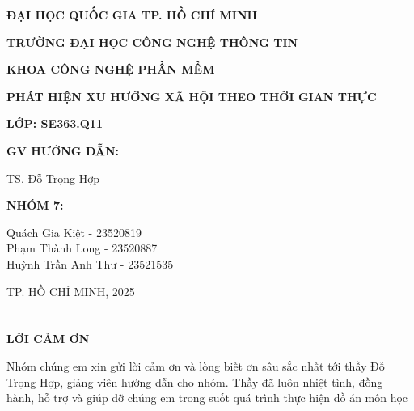 \documentclass[a4paper]{report}
\begin{document}
\fontsize{13pt}{15.6pt}\selectfont


\begin{titlepage}
    \centering
    \vspace*{1cm}

    {\Large \bfseries ĐẠI HỌC QUỐC GIA TP. HỒ CHÍ MINH}

    {\Large \bfseries TRƯỜNG ĐẠI HỌC CÔNG NGHỆ THÔNG TIN}

    {\Large \bfseries KHOA CÔNG NGHỆ PHẦN MỀM}

    \vspace{3cm}


    {\Large \bfseries PHÁT HIỆN XU HƯỚNG XÃ HỘI THEO THỜI GIAN THỰC}

    \vspace{3cm}

    {\large \bfseries LỚP: SE363.Q11}

    \vspace{1cm}

    {\large \bfseries GV HƯỚNG DẪN:}

    {\large TS. Đỗ Trọng Hợp}

    \vspace{1cm}

    {\large \bfseries NHÓM 7:}

    {\large Quách Gia Kiệt - 23520819} \\
    {\large Phạm Thành Long - 23520887} \\
    {\large Huỳnh Trần Anh Thư - 23521535} \\

    \vspace{4cm}

    {\large TP. HỒ CHÍ MINH, 2025}
\end{titlepage}

\chapter*{}
\begin{center}
    \Large\bfseries LỜI CẢM ƠN
\end{center}

Nhóm chúng em xin gửi lời cảm ơn và lòng biết ơn sâu sắc nhất tới thầy
Đỗ Trọng Hợp, giảng viên hướng dẫn cho nhóm. Thầy đã luôn nhiệt tình, đồng
hành, hỗ trợ và giúp đỡ chúng em trong suốt quá trình thực hiện đồ án môn học
\end{document}
